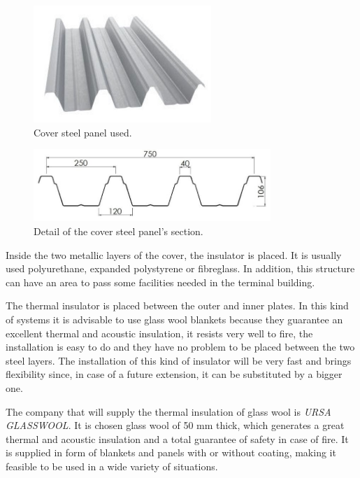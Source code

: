 \begin{figure}[H]
	\centering
	\includegraphics[clip, trim=0cm 0cm 0cm 0cm, width=0.6\textwidth]{./images/cover/profile}
	\caption{Cover steel panel used.}
	\label{profile}
\end{figure}

\begin{figure}[H]
	\centering
	\includegraphics[clip, trim=0cm 0cm 0cm 0cm, width=0.8\textwidth]{./images/cover/profiledimension}
	\caption{Detail of the cover steel panel's section.}
	\label{profiledimension}
\end{figure}

Inside the two metallic layers of the cover, the insulator is placed. It is usually used polyurethane, expanded polystyrene or fibreglass. In addition, this structure can have an area to pass some facilities needed in the terminal building.

The thermal insulator is placed between the outer and inner plates. In this kind of systems it is advisable to use glass wool blankets because they guarantee an excellent thermal and acoustic insulation, it resists very well to fire, the installation is easy to do and they have no problem to be placed between the two steel layers. The installation of this kind of insulator will be very fast and brings flexibility since, in case of a future extension, it can be substituted by a bigger one.

The company that will supply the thermal insulation of glass wool is \textit{URSA GLASSWOOL}. It is chosen glass wool of 50 mm thick, which generates a great thermal and acoustic insulation and a total guarantee of safety in case of fire. It is supplied in form of blankets and panels with or without coating, making it feasible to be used in a wide variety of situations.


